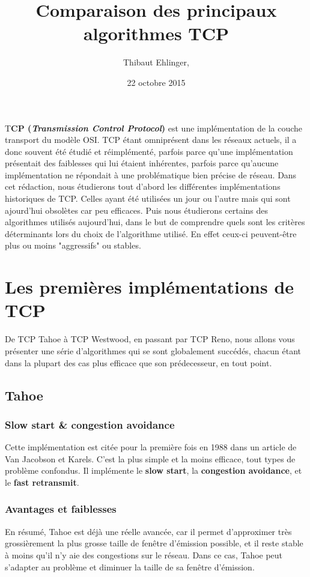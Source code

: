 \documentclass[	DIV=calc,%
							paper=a4,%
							fontsize=11pt,%
							twocolumn]{scrartcl}	 					%
\title{Comparaison des principaux algorithmes TCP}					%
\author{Thibaut Ehlinger, }											%
\date{22 octobre 2015}
\newcommand{\initial}[1]{%
     \lettrine[lines=3,lhang=0.3,nindent=0em]{
     				\color{DarkGoldenrod}
     				{\textsf{#1}}}{}}
\begin{document}
\maketitle
\thispagestyle{fancy} 			%
\initial{T}\textbf{CP (\textit{Transmission Control Protocol})} est une implémentation de la couche transport du modèle OSI. TCP étant omniprésent dans les réseaux actuels, il a donc souvent été étudié et réimplémenté, parfois parce qu'une implémentation présentait des faiblesses qui lui étaient inhérentes, parfois parce qu'aucune implémentation ne répondait à une problématique bien précise de réseau. Dans cet rédaction, nous étudierons tout d'abord les différentes implémentations historiques de TCP. Celles ayant été utilisées un jour ou l'autre mais qui sont ajourd'hui obsolètes car peu efficaces. Puis nous étudierons certains des algorithmes utilisés aujourd'hui, dans le but de comprendre quels sont les critères déterminants lors du choix de l'algorithme utilisé. En effet ceux-ci peuvent-être plus ou moins "aggressifs" ou stables.

\section*{Les premières implémentations de TCP}
De TCP Tahoe à TCP Westwood, en passant par TCP Reno, nous allons vous présenter une série d'algorithmes qui se sont globalement succédés, chacun étant dans la plupart des cas plus efficace que son prédecesseur, en tout point.

\subsection*{Tahoe}
\subsubsection*{Slow start \& congestion avoidance}
Cette implémentation est citée pour la première fois en 1988 dans un article de Van Jacobson et Karels. C'est la plus simple et la moins efficace, tout types de problème confondus. Il implémente le \textbf{slow start}, la \textbf{congestion avoidance}, et le \textbf{fast retransmit}.

\subsubsection*{Avantages et faiblesses}
En résumé, Tahoe est déjà une réelle avancée, car il permet d'approximer très grossièrement la plus grosse taille de fenêtre d'émission possible, et il reste stable à moins qu'il n'y aie des congestions sur le réseau. Dans ce cas, Tahoe peut s'adapter au problème et diminuer la taille de sa fenêtre d'émission.
\end{document}
